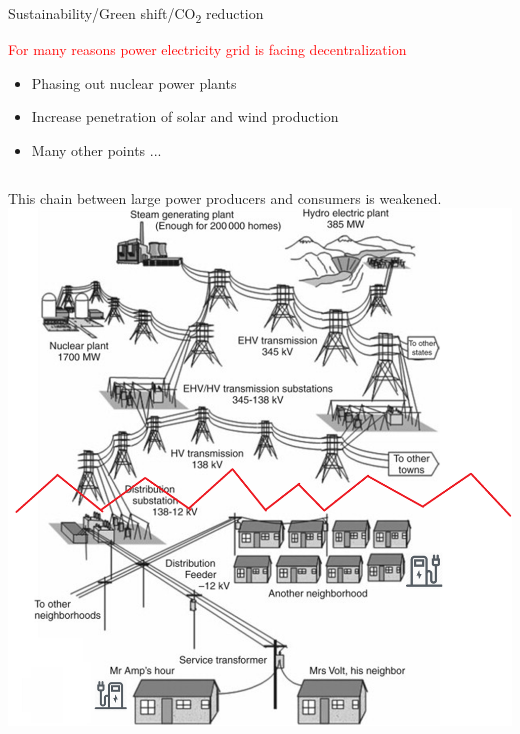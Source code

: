 \documentclass{beamer}
\begin{document}

\begin{frame}{Sustainability/Green shift/CO\textsubscript{2} reduction}
\begin{alertblock}{\textcolor{red}{For many reasons power electricity grid is facing decentralization}}
\begin{itemize}
\item Phasing out nuclear power plants
\item Increase penetration of solar and wind production
\item Many other points ...
\end{itemize}
\end{alertblock}
\begin{columns}
    This chain between large power producers and consumers is weakened.
\includegraphics[width=2 in , height=1.6 in]{Figures/EVchalendgebreak.png}
\end{columns}
\end{frame}

\end{document}
